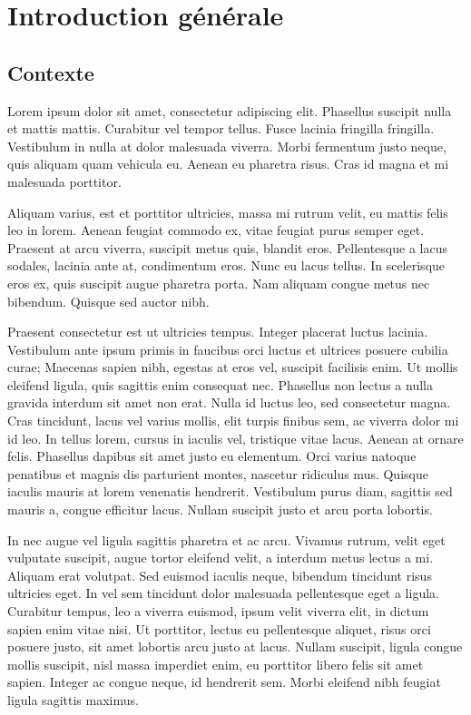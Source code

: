 %
\def\thischaptitle{Introduction générale}
\chapter*{\thischaptitle}
\addcontentsline{toc}{chapter}{\thischaptitle}
%
\section{Contexte}

Lorem ipsum dolor sit amet, consectetur adipiscing elit. Phasellus suscipit nulla et mattis mattis. Curabitur vel tempor tellus. 
Fusce lacinia fringilla fringilla. Vestibulum in nulla at dolor malesuada viverra. Morbi fermentum justo neque, quis aliquam quam vehicula eu. 
Aenean eu pharetra risus. Cras id magna et mi malesuada porttitor.

Aliquam varius, est et porttitor ultricies, massa mi rutrum velit, eu mattis felis leo in lorem. 
Aenean feugiat commodo ex, vitae feugiat purus semper eget. Praesent at arcu viverra, suscipit metus quis, blandit eros. 
Pellentesque a lacus sodales, lacinia ante at, condimentum eros. Nunc eu lacus tellus. In scelerisque eros ex, quis suscipit augue pharetra porta. 
Nam aliquam congue metus nec bibendum. Quisque sed auctor nibh.

Praesent consectetur est ut ultricies tempus. Integer placerat luctus lacinia. 
Vestibulum ante ipsum primis in faucibus orci luctus et ultrices posuere cubilia curae; Maecenas sapien nibh, egestas at eros vel, suscipit facilisis enim. 
Ut mollis eleifend ligula, quis sagittis enim consequat nec. Phasellus non lectus a nulla gravida interdum sit amet non erat. 
Nulla id luctus leo, sed consectetur magna. Cras tincidunt, lacus vel varius mollis, elit turpis finibus sem, ac viverra dolor mi id leo. 
In tellus lorem, cursus in iaculis vel, tristique vitae lacus. Aenean at ornare felis. Phasellus dapibus sit amet justo eu elementum. 
Orci varius natoque penatibus et magnis dis parturient montes, nascetur ridiculus mus. Quisque iaculis mauris at lorem venenatis hendrerit. 
Vestibulum purus diam, sagittis sed mauris a, congue efficitur lacus. Nullam suscipit justo et arcu porta lobortis.

In nec augue vel ligula sagittis pharetra et ac arcu. Vivamus rutrum, velit eget vulputate suscipit, augue tortor eleifend velit, a interdum metus lectus a mi. 
Aliquam erat volutpat. Sed euismod iaculis neque, bibendum tincidunt risus ultricies eget. 
In vel sem tincidunt dolor malesuada pellentesque eget a ligula. Curabitur tempus, leo a viverra euismod, ipsum velit viverra elit, in dictum sapien enim vitae nisi. Ut porttitor, lectus eu pellentesque aliquet, risus orci posuere justo, sit amet lobortis arcu justo at lacus. 
Nullam suscipit, ligula congue mollis suscipit, nisl massa imperdiet enim, eu porttitor libero felis sit amet sapien. 
Integer ac congue neque, id hendrerit sem. Morbi eleifend nibh feugiat ligula sagittis maximus.

